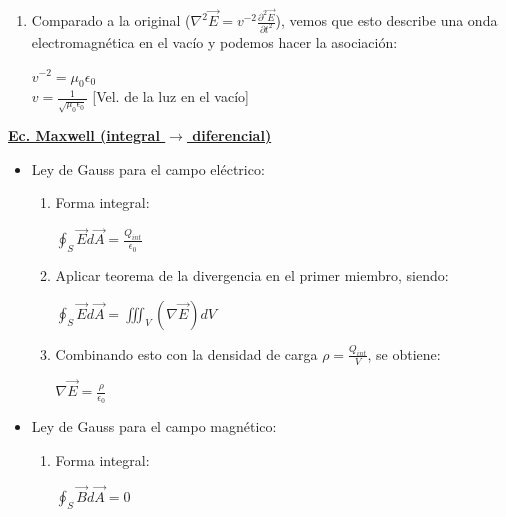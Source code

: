 \documentclass[a4paper]{article}
\begin{document}
\begin{multicols}{2}
\begin{itemize}
\begin{enumerate}
                                \item Comparado a la original ($\nabla ^2\vec{E} = v^{-2} \frac{\partial ^2 \vec{E}}{\partial t ^2}$), vemos que esto describe una onda electromagnética en el vacío y podemos hacer la asociación:
                                    \begin{center} $v^{-2} = \mu_0 \epsilon_0$ \\[5pt] $v = \frac{1}{\sqrt{\mu_0 \epsilon_0}}$ \hspace{5mm} [Vel. de la luz en el vacío] \end{center}
                            \end{enumerate}
                    \end{itemize}
                    \underline{\textbf{Ec. Maxwell (integral $\rightarrow$ diferencial)}}
                    \begin{itemize}
                        \item Ley de Gauss para el campo eléctrico:
                            \begin{enumerate}
                                \item Forma integral:
                                    \begin{center} $\oint_S \vec{E} d\vec{A} = \frac{Q_{int}}{\epsilon_0}$ \end{center}
                                \item Aplicar teorema de la divergencia en el primer miembro, siendo:
                                    \begin{center} $\oint_S \vec{E} d\vec{A} = \iiint_V (\nabla \vec{E})dV$ \end{center}
                                \item Combinando esto con la densidad de carga $\rho = \frac{Q_{int}}{V}$, se obtiene:
                                    \begin{center} $\nabla \vec{E} = \frac{\rho}{\epsilon_0}$ \end{center}
                            \end{enumerate}
                        \item Ley de Gauss para el campo magnético:
                            \begin{enumerate}
                                \item Forma integral:
                                    \begin{center} $\oint_S \vec{B} d\vec{A} = 0$ \end{center}

\end{enumerate}
\end{itemize}
\end{multicols}
\end{document}
